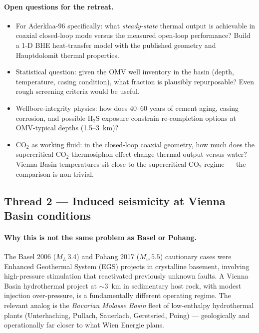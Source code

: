 \documentclass{article}
\begin{document}
\paragraph{Open questions for the retreat.}
\begin{itemize}
\item For Aderklaa-96 specifically: what \emph{steady-state} thermal output
is achievable in coaxial closed-loop mode versus the measured open-loop
performance? Build a 1-D BHE heat-transfer model with the published
geometry and Hauptdolomit thermal properties.
\item Statistical question: given the OMV well inventory in the basin
(depth, temperature, casing condition), what fraction is plausibly
repurposable? Even rough screening criteria would be useful.
\item Wellbore-integrity physics: how does 40--60 years of cement aging,
casing corrosion, and possible $\mathrm{H_2S}$ exposure constrain
re-completion options at OMV-typical depths (1.5--3~km)?
\item CO$_2$ as working fluid: in the closed-loop coaxial geometry,
how much does the supercritical CO$_2$ thermosiphon effect change
thermal output versus water? Vienna Basin temperatures sit close to
the supercritical CO$_2$ regime --- the comparison is non-trivial.
\end{itemize}

\subsection*{Thread 2 --- Induced seismicity at Vienna Basin conditions}

\paragraph{Why this is not the same problem as Basel or Pohang.}
The Basel 2006 ($M_L\,3.4$) and Pohang 2017 ($M_w\,5.5$) cautionary cases
were Enhanced Geothermal System (EGS) projects in crystalline basement,
involving high-pressure stimulation that reactivated previously unknown
faults. A Vienna Basin hydrothermal project at $\sim 3$~km in sedimentary
host rock, with modest injection over-pressure, is a fundamentally
different operating regime. The relevant analog is the
\emph{Bavarian Molasse Basin} fleet of low-enthalpy hydrothermal plants
(Unterhaching, Pullach, Sauerlach, Geretsried, Poing) ---
geologically and operationally far closer to what Wien Energie plans.
\end{document}
